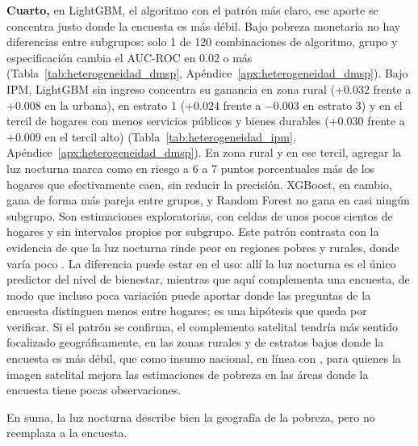 \documentclass[12pt, letterpaper]{article}
\begin{document}


\textbf{Cuarto,} en LightGBM, el algoritmo con el patrón más claro, ese
aporte se concentra justo donde la encuesta es más débil. Bajo pobreza
monetaria no hay diferencias entre subgrupos: solo 1 de 120 combinaciones
de algoritmo, grupo y especificación cambia el AUC-ROC en 0.02 o más
(Tabla~\ref{tab:heterogeneidad_dmsp},
Apéndice~\ref{apx:heterogeneidad_dmsp}). Bajo IPM, LightGBM sin ingreso
concentra su ganancia en zona rural ($+0.032$ frente a $+0.008$ en la
urbana), en estrato 1 ($+0.024$ frente a $-0.003$ en estrato 3) y en el
tercil de hogares con menos servicios públicos y bienes durables
($+0.030$ frente a $+0.009$ en el tercil alto)
(Tabla~\ref{tab:heterogeneidad_ipm},
Apéndice~\ref{apx:heterogeneidad_dmsp}). En zona rural y en ese tercil,
agregar la luz nocturna marca como en riesgo a 6 a 7 puntos porcentuales
más de los hogares que efectivamente caen, sin reducir la precisión.
XGBoost, en cambio, gana de forma más pareja entre grupos, y Random
Forest no gana en casi ningún subgrupo. Son estimaciones exploratorias,
con celdas de unos pocos cientos de hogares y sin intervalos propios por
subgrupo. Este patrón contrasta con la evidencia de que la luz nocturna
rinde peor en regiones pobres y rurales, donde varía poco
\parencite{hall2023}. La diferencia puede estar en el uso: allí la luz
nocturna es el único predictor del nivel de bienestar, mientras que aquí
complementa una encuesta, de modo que incluso poca variación puede aportar
donde las preguntas de la encuesta distinguen menos entre hogares; es una
hipótesis que queda por verificar. Si el patrón se confirma, el
complemento satelital tendría más sentido focalizado geográficamente, en
las zonas rurales y de estratos bajos donde la encuesta es más débil, que
como insumo nacional, en línea con \textcite{newhouse2025}, para quienes
la imagen satelital mejora las estimaciones de pobreza en las
áreas donde la encuesta tiene pocas observaciones.

En suma, la luz nocturna describe bien la geografía de la pobreza, pero
no reemplaza a la encuesta.

\end{document}

